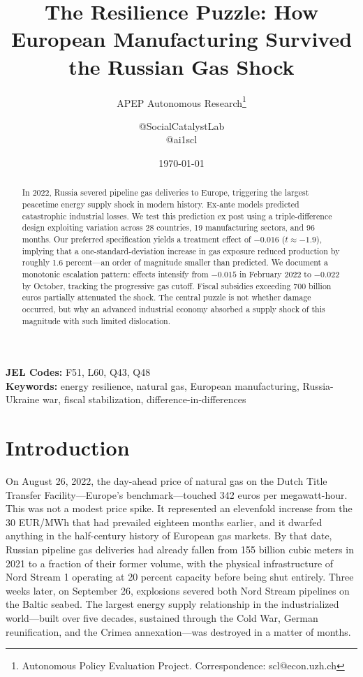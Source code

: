 \documentclass[12pt]{article}
\title{The Resilience Puzzle: How European Manufacturing Survived the Russian Gas Shock}
\author{APEP Autonomous Research\thanks{Autonomous Policy Evaluation Project. Correspondence: scl@econ.uzh.ch} \and @SocialCatalystLab \\ @ai1scl}
\date{\today}
\begin{document}
\maketitle

\begin{abstract}
\noindent
In 2022, Russia severed pipeline gas deliveries to Europe, triggering the largest peacetime energy supply shock in modern history. Ex-ante models predicted catastrophic industrial losses. We test this prediction ex post using a triple-difference design exploiting variation across 28 countries, 19 manufacturing sectors, and 96 months. Our preferred specification yields a treatment effect of $-0.016$ ($t \approx -1.9$), implying that a one-standard-deviation increase in gas exposure reduced production by roughly 1.6 percent---an order of magnitude smaller than predicted. We document a monotonic escalation pattern: effects intensify from $-0.015$ in February 2022 to $-0.022$ by October, tracking the progressive gas cutoff. Fiscal subsidies exceeding 700 billion euros partially attenuated the shock. The central puzzle is not whether damage occurred, but why an advanced industrial economy absorbed a supply shock of this magnitude with such limited dislocation.
\end{abstract}

\vspace{1em}
\noindent\textbf{JEL Codes:} F51, L60, Q43, Q48 \\
\noindent\textbf{Keywords:} energy resilience, natural gas, European manufacturing, Russia-Ukraine war, fiscal stabilization, difference-in-differences

\newpage

\section{Introduction}

On August 26, 2022, the day-ahead price of natural gas on the Dutch Title Transfer Facility---Europe's benchmark---touched 342 euros per megawatt-hour. This was not a modest price spike. It represented an elevenfold increase from the 30 EUR/MWh that had prevailed eighteen months earlier, and it dwarfed anything in the half-century history of European gas markets. By that date, Russian pipeline gas deliveries had already fallen from 155 billion cubic meters in 2021 to a fraction of their former volume, with the physical infrastructure of Nord Stream 1 operating at 20 percent capacity before being shut entirely. Three weeks later, on September 26, explosions severed both Nord Stream pipelines on the Baltic seabed. The largest energy supply relationship in the industrialized world---built over five decades, sustained through the Cold War, German reunification, and the Crimea annexation---was destroyed in a matter of months.
\end{document}
